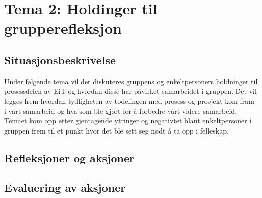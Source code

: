 \chapter{Tema 2: Holdinger til grupperefleksjon}

\section{Situasjonsbeskrivelse}

Under følgende tema vil det diskuteres gruppens og enkeltpersoners holdninger til prosessdelen av EiT og hvordan
disse har påvirket samarbeidet i gruppen. Det vil legges frem hvordan tydligheten av todelingen med prosess og 
prosjekt kom fram i vårt samarbeid og hva som ble gjort for å forbedre vårt videre samarbeid. Temaet kom opp etter 
gjentagende ytringer og negativtet blant enkeltpersoner i gruppen frem til et punkt hvor det ble sett seg nødt å ta opp i felleskap.

\section{Refleksjoner og aksjoner}


\section{Evaluering av aksjoner}